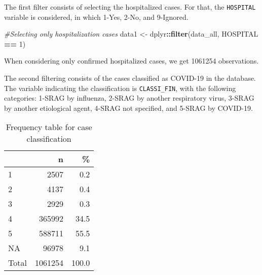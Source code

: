 \documentclass[
]{article}
\newenvironment{Shaded}{\begin{snugshade}}{\end{snugshade}}
\newcommand{\CommentTok}[1]{\textcolor[rgb]{0.56,0.35,0.01}{\textit{#1}}}
\newcommand{\DataTypeTok}[1]{\textcolor[rgb]{0.13,0.29,0.53}{#1}}
\newcommand{\DecValTok}[1]{\textcolor[rgb]{0.00,0.00,0.81}{#1}}
\newcommand{\KeywordTok}[1]{\textcolor[rgb]{0.13,0.29,0.53}{\textbf{#1}}}
\newcommand{\NormalTok}[1]{#1}
\newcommand{\OperatorTok}[1]{\textcolor[rgb]{0.81,0.36,0.00}{\textbf{#1}}}
\newcommand{\OtherTok}[1]{\textcolor[rgb]{0.56,0.35,0.01}{#1}}
\newcommand{\StringTok}[1]{\textcolor[rgb]{0.31,0.60,0.02}{#1}}
\begin{document}
The first filter consists of selecting the hospitalized cases. For that,
the \texttt{HOSPITAL} variable is considered, in which 1-Yes, 2-No, and
9-Ignored.

\begin{Shaded}
\begin{Highlighting}[]
\CommentTok{#Selecting only hospitalization cases}
\NormalTok{data1 <-}\StringTok{ }\NormalTok{dplyr}\OperatorTok{::}\KeywordTok{filter}\NormalTok{(data_all, HOSPITAL }\OperatorTok{==}\StringTok{ }\DecValTok{1}\NormalTok{)}
\end{Highlighting}
\end{Shaded}

When considering only confirmed hospitalized cases, we get 1061254
observations.

The second filtering consists of the cases classified as COVID-19 in the
database. The variable indicating the classification is
\texttt{CLASSI\_FIN}, with the following categories: 1-SRAG by
influenza, 2-SRAG by another respiratory virus, 3-SRAG by another
etiological agent, 4-SRAG not specified, and 5-SRAG by COVID-19.

\begin{Shaded}
\end{Shaded}

\begin{table}[!h]

\caption{\label{tab:unnamed-chunk-3}Frequency table for case classification}
\centering
\begin{tabular}[t]{l|r|r}
\hline
  & n & \%\\
\hline
1 & 2507 & 0.2\\
\hline
2 & 4137 & 0.4\\
\hline
3 & 2929 & 0.3\\
\hline
4 & 365992 & 34.5\\
\hline
5 & 588711 & 55.5\\
\hline
NA & 96978 & 9.1\\
\hline
Total & 1061254 & 100.0\\
\hline
\end{tabular}
\end{table}
\end{document}
